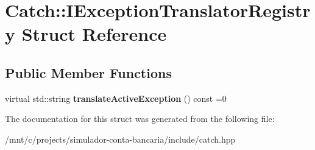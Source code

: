\hypertarget{structCatch_1_1IExceptionTranslatorRegistry}{}\section{Catch\+:\+:I\+Exception\+Translator\+Registry Struct Reference}
\label{structCatch_1_1IExceptionTranslatorRegistry}
\subsection*{Public Member Functions}
\begin{DoxyCompactItemize}
\item 
\mbox{\label{structCatch_1_1IExceptionTranslatorRegistry_af76ae8c331a17f2a94c9720bc0d686bb}} 
virtual std\+::string {\bfseries translate\+Active\+Exception} () const =0
\end{DoxyCompactItemize}


The documentation for this struct was generated from the following file\+:\begin{DoxyCompactItemize}
\item 
/mnt/c/projects/simulador-\/conta-\/bancaria/include/catch.\+hpp\end{DoxyCompactItemize}
